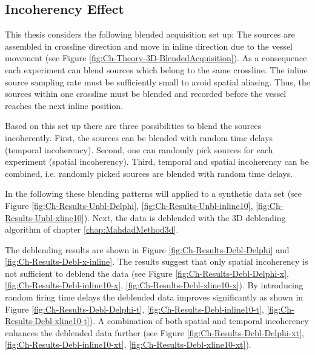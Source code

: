 \subsection*{Incoherency Effect}

This thesis considers the following blended acquisition set up: The sources are assembled in crossline direction and move in inline direction due to the vessel movement (see Figure \ref{fig:Ch-Theory-3D-BlendedAcquisition}). As a consequence each experiment can blend sources which belong to the same crossline. The inline source sampling rate must be sufficiently small to avoid spatial aliasing. Thus, the sources within one crossline must be blended and recorded before the vessel reaches the next inline position.

Based on this set up there are three possibilities to blend the sources incoherently. First, the sources can be blended with random time delays (temporal incoherency). Second, one can randomly pick sources for each experiment (spatial incoherency). Third, temporal and spatial incoherency can be combined, i.e. randomly picked sources are blended with random time delays.

In the following these blending patterns will applied to a synthetic data set (see Figure \ref{fig:Ch-Results-Unbl-Delphi}, \ref{fig:Ch-Results-Unbl-inline10}, \ref{fig:Ch-Results-Unbl-xline10}). Next, the data is deblended with the 3D deblending algorithm of chapter \ref{chap:MahdadMethod3d}. 

The deblending results are shown in Figure \ref{fig:Ch-Results-Debl-Delphi} and \ref{fig:Ch-Results-Debl-x-inline}. The results suggest that only spatial incoherency is not sufficient to deblend the data (see Figure \ref{fig:Ch-Results-Debl-Delphi-x}, \ref{fig:Ch-Results-Debl-inline10-x}, \ref{fig:Ch-Results-Debl-xline10-x}). By introducing random firing time delays the deblended data improves significantly as shown in Figure \ref{fig:Ch-Results-Debl-Delphi-t}, \ref{fig:Ch-Results-Debl-inline10-t}, \ref{fig:Ch-Results-Debl-xline10-t}). A combination of both spatial and temporal incoherency enhances the deblended data further (see Figure \ref{fig:Ch-Results-Debl-Delphi-xt}, \ref{fig:Ch-Results-Debl-inline10-xt}, \ref{fig:Ch-Results-Debl-xline10-xt}).

